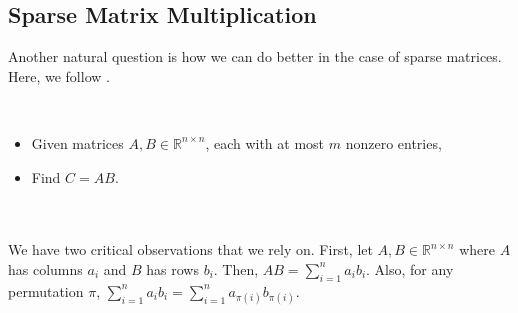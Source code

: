     \subsection{Sparse Matrix Multiplication}

        Another natural question is how we can do better in the case of sparse matrices. Here, we follow \cite{yuster2005fastsparse}.
        \begin{compprob} \label{prob:sparsematmul}
            \vphantom
            \\
            \begin{itemize}
                \item Given matrices \(A,B\in\mathbb{R}^{n\times n}\), each with at most \(m\) nonzero entries,
                \item Find \(C=AB\).
            \end{itemize}
        \end{compprob}
        \vphantom
        \\
        \\
        We have two critical observations that we rely on. First, let \(A,B\in\mathbb{R}^{n\times n}\) where \(A\) has columns \(a_i\) and \(B\) has rows \(b_i\). Then, \(AB=\sum_{i=1}^n a_ib_i\). Also, for any permutation \(\pi\), \(\sum_{i=1}^n a_ib_i=\sum_{i=1}^n a_{\pi(i)}b_{\pi(i)}\).